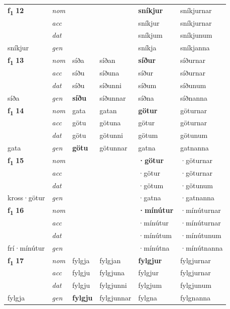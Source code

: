 \begin{longtable}[l]{X>{\footnotesize\itshape}XXXXX}
\multirow{3}{*}{{{\textbf{f{\textsubscript{1}}} \Large{\textbf{12}}}}} & nom &  &  & \textbf{sníkjur} & sníkjurnar \\*
 & acc &  &  & sníkjur & sníkjurnar \\*
 & dat &  &  & sníkjum & sníkjunum \\*
 {\footnotesize{sníkjur}} & gen & \textbf{} &  & sníkja & sníkjanna \\
\cmidrule{1-6}

\multirow{3}{*}{{{\textbf{f{\textsubscript{1}}} \Large{\textbf{13}}}}} & nom & síða & síðan & \textbf{síður} & síðurnar \\*
 & acc & síðu & síðuna & síður & síðurnar \\*
 & dat & síðu & síðunni & síðum & síðunum \\*
 {\footnotesize{síða}} & gen & \textbf{síðu} & síðunnar & síðna & síðnanna \\
\cmidrule{1-6}

\multirow{3}{*}{{{\textbf{f{\textsubscript{1}}} \Large{\textbf{14}}}}} & nom & gata & gatan & \textbf{götur} & göturnar \\*
 & acc & götu & götuna & götur & göturnar \\*
 & dat & götu & götunni & götum & götunum \\*
 {\footnotesize{gata}} & gen & \textbf{götu} & götunnar & gatna & gatnanna \\
\cmidrule{1-6}

\multirow{3}{*}{{{\textbf{f{\textsubscript{1}}} \Large{\textbf{15}}}}} & nom &  &  & \textbf{·götur} & ·göturnar \\*
 & acc &  &  & ·götur & ·göturnar \\*
 & dat &  &  & ·götum & ·götunum \\*
 {\footnotesize{kross\allowbreak ·götur}} & gen & \textbf{} &  & ·gatna & ·gatnanna \\
\cmidrule{1-6}

\multirow{3}{*}{{{\textbf{f{\textsubscript{1}}} \Large{\textbf{16}}}}} & nom &  &  & \textbf{·mínútur} & ·mínúturnar \\*
 & acc &  &  & ·mínútur & ·mínúturnar \\*
 & dat &  &  & ·mínútum & ·mínútunum \\*
 {\footnotesize{frí\allowbreak ·mínútur}} & gen & \textbf{} &  & ·mínútna & ·mínútnanna \\
\cmidrule{1-6}

\multirow{3}{*}{{{\textbf{f{\textsubscript{1}}} \Large{\textbf{17}}}}} & nom & fylgja & fylgjan & \textbf{fylgjur} & fylgjurnar \\*
 & acc & fylgju & fylgjuna & fylgjur & fylgjurnar \\*
 & dat & fylgju & fylgjunni & fylgjum & fylgjunum \\*
 {\footnotesize{fylgja}} & gen & \textbf{fylgju} & fylgjunnar & fylgna & fylgnanna \\
\cmidrule{1-6}


\end{longtable}
